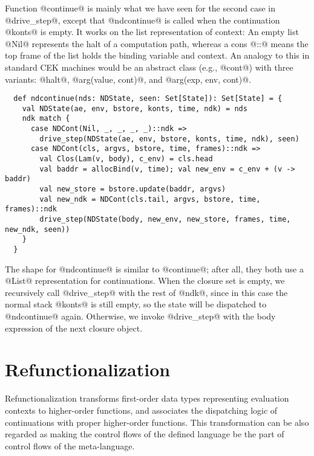 \documentclass[acmsmall, review]{acmart}\settopmatter{}
\begin{document}
Function @continue@ is mainly what we have seen for the second case in @drive_step@,
except that @ndcontinue@ is called when the continuation @konts@ is empty.
It works on the list representation of context: An empty list @Nil@ represents the
halt of a computation path, whereas a cons @::@ means the top frame of the list
holds the binding variable and context.
An analogy to this in standard CEK machines would be an abstract class (e.g., @cont@)
with three variants: @halt@, @arg(value, cont)@, and @arg(exp, env, cont)@.

\begin{lstlisting}
  def ndcontinue(nds: NDState, seen: Set[State]): Set[State] = {
    val NDState(ae, env, bstore, konts, time, ndk) = nds
    ndk match {
      case NDCont(Nil, _, _, _, _)::ndk =>
        drive_step(NDState(ae, env, bstore, konts, time, ndk), seen)
      case NDCont(cls, argvs, bstore, time, frames)::ndk =>
        val Clos(Lam(v, body), c_env) = cls.head
        val baddr = allocBind(v, time); val new_env = c_env + (v -> baddr)
        val new_store = bstore.update(baddr, argvs)
        val new_ndk = NDCont(cls.tail, argvs, bstore, time, frames)::ndk
        drive_step(NDState(body, new_env, new_store, frames, time, new_ndk, seen))
    }
  }
\end{lstlisting}

The shape for @ndcontinue@ is similar to @continue@; after
all, they both use a @List@ representation for continuations.
When the closure set is empty, we recursively call @drive_step@ with the rest
of @ndk@, since in this case the normal stack @konts@ is still empty, so
the state will be dispatched to @ndcontinue@ again.
Otherwise, we invoke @drive_step@ with the body expression of the next closure object.

\section{Refunctionalization} \label{sec:refunc}

Refunctionalization transforms first-order data types representing evaluation contexts 
to higher-order functions, and associates the dispatching logic of continuations with
proper higher-order functions.
This transformation can be also regarded as making the control flows of the defined 
language be the part of control flows of the meta-language.
\end{document}
